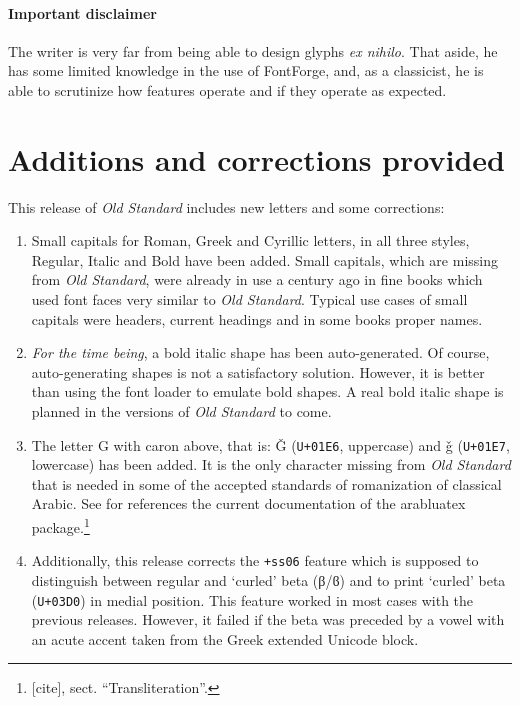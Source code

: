 \paragraph{Important disclaimer}
The writer is very far from being able to design glyphs \emph{ex
  nihilo}. That aside, he has some limited knowledge in the use of
FontForge, and, as a classicist, he is able to scrutinize how features
operate and if they operate as expected.

\section{Additions and corrections provided}
\label{sec:addit-corr-prov}
This release of \emph{Old Standard} includes new letters and some
corrections:
\begin{enumerate}
\item Small capitals for Roman, Greek and Cyrillic letters, in all
  three styles, Regular, Italic and Bold have been added. Small
  capitals, which are missing from \emph{Old Standard}, were already
  in use a century ago in fine books which used font faces very
  similar to \emph{Old Standard}. Typical use cases of small capitals
  were headers, current headings and in some books proper names.
\item \emph{For the time being}, a bold italic shape has been
  auto-generated. Of course, auto-generating shapes is not a
  satisfactory solution. However, it is better than using the
  font loader to emulate bold shapes. A real bold italic shape is
  planned in the versions of \emph{Old Standard} to come.
\item The letter G with caron above, that is: Ǧ (\verb|U+01E6|,
  uppercase) and ǧ (\verb|U+01E7|, lowercase) has been added. It is
  the only character missing from \emph{Old Standard} that is needed
  in some of the accepted standards of romanization of classical
  Arabic. See for references the current documentation of the
  \textsf{arabluatex} package.\footnote{[cite], sect{.}
    \enquote{Transliteration}.}
\item Additionally, this release corrects the \verb|+ss06| feature
  which is supposed to distinguish between regular and
  \enquote*{curled} beta (β/ϐ) and to print \enquote*{curled} beta
  (\verb|U+03D0|) in medial position. This feature worked in most
  cases with the previous releases. However, it failed if the beta was
  preceded by a vowel with an acute accent taken from the Greek
  extended Unicode block.
\end{enumerate}

